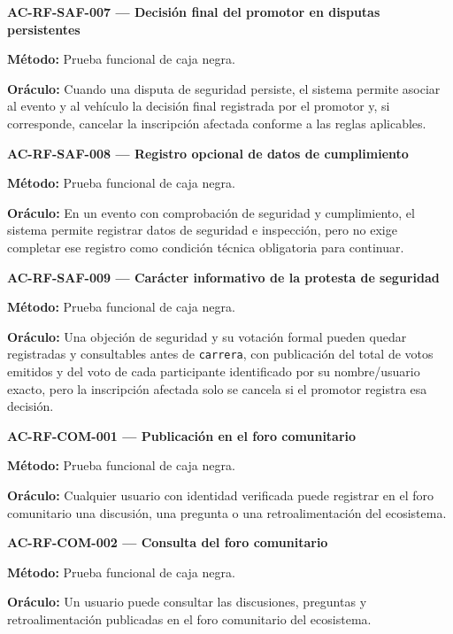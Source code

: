 \documentclass[10pt,letterpaper]{article}
\begin{document}
\noindent\textbf{AC-RF-SAF-007 --- Decisión final del promotor en disputas persistentes}\par
\textbf{Método:} Prueba funcional de caja negra.\par
\textbf{Oráculo:} Cuando una disputa de seguridad persiste, el sistema permite asociar al evento y al vehículo la decisión final registrada por el promotor y, si corresponde, cancelar la inscripción afectada conforme a las reglas aplicables.\par\vspace{0.45em}
\noindent\textbf{AC-RF-SAF-008 --- Registro opcional de datos de cumplimiento}\par
\textbf{Método:} Prueba funcional de caja negra.\par
\textbf{Oráculo:} En un evento con comprobación de seguridad y cumplimiento, el sistema permite registrar datos de seguridad e inspección, pero no exige completar ese registro como condición técnica obligatoria para continuar.\par\vspace{0.45em}
\noindent\textbf{AC-RF-SAF-009 --- Carácter informativo de la protesta de seguridad}\par
\textbf{Método:} Prueba funcional de caja negra.\par
\textbf{Oráculo:} Una objeción de seguridad y su votación formal pueden quedar registradas y consultables antes de \texttt{carrera}, con publicación del total de votos emitidos y del voto de cada participante identificado por su nombre/usuario exacto, pero la inscripción afectada solo se cancela si el promotor registra esa decisión.\par\vspace{0.45em}
\noindent\textbf{AC-RF-COM-001 --- Publicación en el foro comunitario}\par
\textbf{Método:} Prueba funcional de caja negra.\par
\textbf{Oráculo:} Cualquier usuario con identidad verificada puede registrar en el foro comunitario una discusión, una pregunta o una retroalimentación del ecosistema.\par\vspace{0.45em}
\noindent\textbf{AC-RF-COM-002 --- Consulta del foro comunitario}\par
\textbf{Método:} Prueba funcional de caja negra.\par
\textbf{Oráculo:} Un usuario puede consultar las discusiones, preguntas y retroalimentación publicadas en el foro comunitario del ecosistema.\par\vspace{0.45em}
\end{document}
